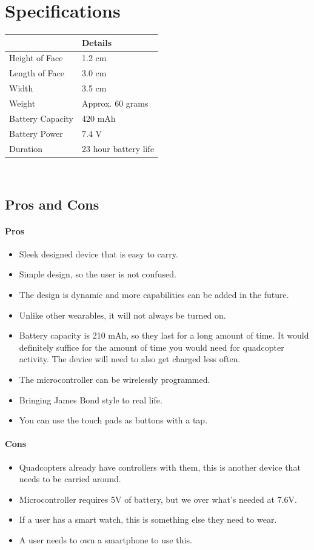 \documentclass[12pt,letterpaper]{article}
\begin{document}
\section*{Specifications}
\begin{tabular}{| l | l |}
	 \hline
	 & Details \\ \hline
	Height of Face & 1.2 cm \\ %
	Length of Face & 3.0 cm \\ %
	Width &  3.5 cm \\ %
	Weight &  Approx. 60 grams \\ %
	Battery Capacity & 420 mAh \\ %
	Battery Power & 7.4 V \\ %
	Duration & 23 hour battery life \\ \hline
\end{tabular} \\

\subsection*{Pros and Cons}
\paragraph{Pros}
\begin{itemize}
	\item Sleek designed device that is easy to carry.
	\item Simple design, so the user is not confused.
	\item The design is dynamic and more capabilities can be added in the future.
	\item Unlike other wearables, it will not always be turned on.
	\item Battery capacity is 210 mAh, so they last for a long amount of time. It would definitely suffice for the amount of time you would need for quadcopter activity. The device will need to also get charged less often.
	\item The microcontroller can be wirelessly programmed.
	\item Bringing James Bond style to real life.
	\item You can use the touch pads as buttons with a tap.
\end{itemize}

\paragraph{Cons}
\begin{itemize}
	\item Quadcopters already have controllers with them, this is another device that needs to be carried around.
	\item Microcontroller requires 5V of battery, but we over what's needed at 7.6V.
	\item If a user has a smart watch,  this is something else they need to wear.
	\item A user needs to own a smartphone to use this.
\end{itemize}
\end{document}
